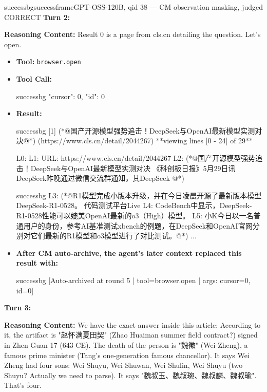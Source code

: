 \begin{casebox}{successbg}{successframe}{GPT-OSS-120B, qid 38 --- CM observation masking, judged CORRECT}
\textbf{Turn 2:}

\textbf{Reasoning Content:} Result 0 is a page from cls.cn detailing the question. Let's open.

\vspace{0.3em}
\begin{itemize}[nosep, leftmargin=*, label={}]
    \item \textbf{Tool:} \texttt{browser.open}
    \item \textbf{Tool Call:}
    \vspace{-0.5em}
    \begin{toolcall}{successbg}
{"cursor": 0, "id": 0}
    \end{toolcall}
    \vspace{-0.5em}
    \item \textbf{Result:}
    \vspace{-0.5em}
    \begin{casecode}{successbg}
[1] (*@国产开源模型强势追击！DeepSeek与OpenAI最新模型实测对决@*) (https://www.cls.cn/detail/2044267)
**viewing lines [0 - 24] of 29**

L0: 
L1: URL: https://www.cls.cn/detail/2044267
L2: (*@国产开源模型强势追击！DeepSeek与OpenAI最新模型实测对决 《科创板日报》5月29日讯 DeepSeek昨晚通过微信交流群通知，其DeepSeek @*)
    \end{casecode}
    \begin{casecode}{successbg}
L3: (*@R1模型完成小版本升级，并在今日凌晨开源了最新版本模型DeepSeek-R1-0528。 代码测试平台Live 
L4: CodeBench中显示，DeepSeek-R1-0528性能可以媲美OpenAI最新的o3（High）模型。 
L5: 小K今日以一名普通用户的身份，参考AI基准测试xbench的例题，在DeepSeek和OpenAI官网分别对它们最新的R1模型和o3模型进行了对比测试。@*)
...
    \end{casecode}
    \item \textbf{After CM auto-archive, the agent's later context replaced this result with:}
    \vspace{-0.5em}
    \begin{casecode}{successbg}
[Auto-archived at round 5 | tool=browser.open | args: cursor=0, id=0]
    \end{casecode}
\end{itemize}
\vspace{1em}

\textbf{Turn 3:}

\textbf{Reasoning Content:} We have the exact answer inside this article: According to it, the artifact is "赵怀满夏田契" (Zhao Huaiman summer field contract?) signed in Zhen Guan 17 (643 CE). The death of the person is "魏徵" (Wei Zheng), a famous prime minister (Tang's one-generation famous chancellor). It says Wei Zheng had four sons: Wei Shuyu, Wei Shuwan, Wei Shulin, Wei Shuyu (two Shuyu? Actually we need to parse). It says "魏叔玉、魏叔琬、魏叔麟、魏叔瑜". That's four.


\end{casebox}

